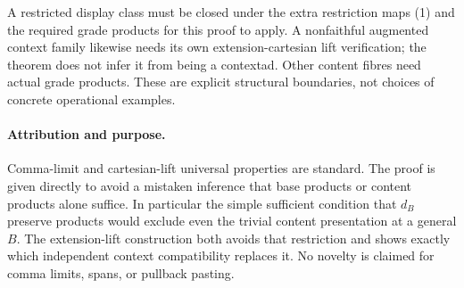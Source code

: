 \documentclass{article}
\begin{document}
A restricted display class must be closed under the extra restriction maps (1) and the required grade products for this proof to apply. A nonfaithful augmented context family likewise needs its own extension-cartesian lift verification; the theorem does not infer it from being a contextad. Other content fibres need actual grade products. These are explicit structural boundaries, not choices of concrete operational examples.

\paragraph{Attribution and purpose.} Comma-limit and cartesian-lift universal properties are standard. The proof is given directly to avoid a mistaken inference that base products or content products alone suffice. In particular the simple sufficient condition that $d_B$ preserve products would exclude even the trivial content presentation at a general $B$. The extension-lift construction both avoids that restriction and shows exactly which independent context compatibility replaces it. No novelty is claimed for comma limits, spans, or pullback pasting.
\end{document}
